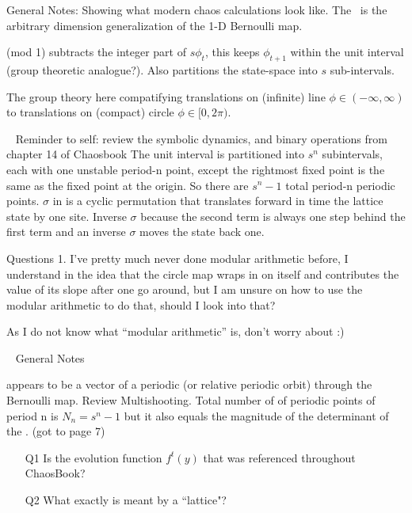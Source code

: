 \begin{description}
General Notes:
Showing what modern chaos calculations look like.
The \catlatt\ is the arbitrary dimension generalization of the 1-D Bernoulli map.

(mod 1) subtracts the integer part of $s\phi_t$, this keeps $\phi_{t+1}$
within the unit interval (group theoretic analogue?). Also partitions
the state-space into $s$ sub-intervals.

\item[2020-08-24 Predrag]
The group theory here compatifying translations on (infinite) line
$\phi\in(-\infty,\infty)$ to translations on (compact) circle
$\phi\in[0,2\pi)$.

\item[2020-08-24 Sidney]~
Reminder to self: review the symbolic dynamics, and binary operations from chapter 14 of Chaosbook
The unit interval is partitioned into $s^n$ subintervals, each with one unstable period-n point, except the rightmost fixed point is the same as the fixed point at the origin. So there are $s^n-1$ total period-n periodic points.
$\sigma$ in  is a cyclic permutation that translates forward in time the lattice state by one site. Inverse $\sigma$ because the second term is always one step behind the first term and an inverse $\sigma$ moves the state back one.
\vspace{3mm}

Questions
1. I've pretty much never done modular arithmetic before, I understand  in the idea that the circle map wraps in on itself and contributes the value of its slope after one go around, but I am unsure on how to use the modular arithmetic to do that, should I look into that?

\item[2020-08-24 Predrag]
As I do not know what ``modular arithmetic'' is, don't worry about :)

\item[2020-08-25 Sidney]~
General Notes

 appears to be a vector of a periodic (or relative
periodic orbit) through the Bernoulli map. Review Multishooting. Total
number of of periodic points of period n is $N_n=s^n-1$ but it also
equals the magnitude of the determinant of the {\jacobianOrb}.
(got to page 7)

\vspace{3mm}

\begin{itemize}
  \item[Q1]
Is  the evolution function $f^t(y)$ that was
referenced throughout ChaosBook?
  \item[Q2]
What exactly is meant by a ``lattice"?
\end{itemize}


\end{description}

